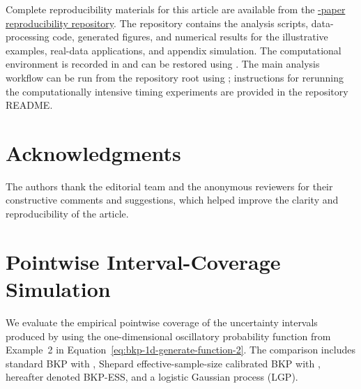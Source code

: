 \documentclass[article, shortnames]{jss}
\begin{document}
Complete reproducibility materials for this article are available from the \href{https://github.com/Jiangyan-Zhao/BKP-paper}
{-paper reproducibility repository}.
The repository contains the analysis scripts, data-processing code, generated figures, and numerical results for the illustrative examples, real-data applications, and appendix simulation.
The computational environment is recorded in  and can be restored using .
The main analysis workflow can be run from the repository root using ; instructions for rerunning the computationally intensive timing experiments are provided in the repository README.


\section*{Acknowledgments}

The authors thank the editorial team and the anonymous reviewers for their constructive comments and suggestions, which helped improve the clarity and reproducibility of the article.





\newpage
\appendix
\section{Pointwise Interval-Coverage Simulation} \label{app:coverage}

We evaluate the empirical pointwise coverage of the uncertainty intervals produced by  using the one-dimensional oscillatory probability function from Example~2 in Equation~\ref{eq:bkp-1d-generate-function-2}. The comparison includes standard BKP with , Shepard effective-sample-size calibrated BKP with , hereafter denoted BKP-ESS, and a logistic Gaussian process (LGP).
\end{document}
